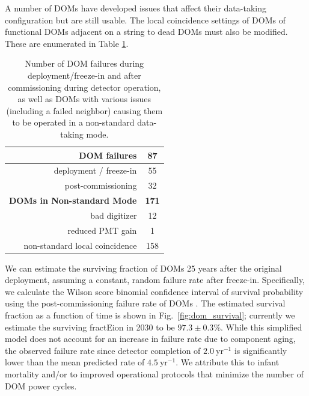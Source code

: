 A number of DOMs have developed issues that affect their data-taking
configuration but are still usable.  The local coincidence settings of DOMs of
functional DOMs adjacent on a string to dead DOMs must also be
modified. These are enumerated in Table \ref{tab:dom_failures}.  

\begin{table}[h]
  \centering
  \begin{tabular}{| r | c |}
    \hline
    \bf{DOM failures} & \bf{87} \\
    \hline    
    deployment / freeze-in & 55 \\
    post-commissioning & 32 \\
    \hline
    \hline
    \bf{DOMs in Non-standard Mode} & \bf{171} \\
    \hline
    bad digitizer & 12 \\
    reduced PMT gain & 1 \\
    non-standard local coincidence & 158 \\
    \hline    
  \end{tabular}
  \caption{Number of DOM failures during deployment/freeze-in and after
    commissioning during detector operation, as well as DOMs with various
    issues (including a failed neighbor) causing them to be operated in a
    non-standard data-taking mode.} 
  \label{tab:dom_failures}
\end{table}

We can estimate the surviving fraction of DOMs 25 years after the original
deployment, assuming a constant, random failure rate after freeze-in.
Specifically, we calculate the Wilson score binomial confidence interval of
survival probability using the post-commissioning failure rate of DOMs
\cite{Wilson_Score}.  The estimated survival fraction as a function of
time is shown in Fig.~\ref{fig:dom_survival}; currently we estimate the
surviving fractEion in 2030 to be $97.3\pm0.3\%$.  While this simplified
model does not account for an increase in failure rate due to component aging, the
observed failure rate since detector completion of $2.0~\mathrm{yr}^{-1}$ is
significantly lower than the mean predicted rate of $4.5~\mathrm{yr}^{-1}$.  We attribute
this to infant mortality and/or to improved operational protocols that
minimize the number of DOM power cycles.

